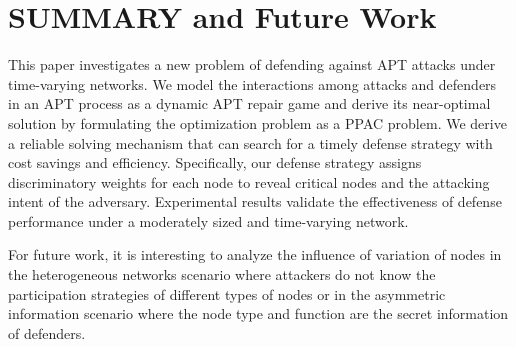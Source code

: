 \documentclass[lettersize,journal]{IEEEtran}
\begin{document}
\section{SUMMARY and Future Work}
This paper investigates a new problem of defending against APT attacks under time-varying networks. We model the interactions among attacks and defenders in an APT process as a dynamic APT repair game and derive its near-optimal solution by formulating the optimization problem as a PPAC problem. We derive a reliable solving mechanism that can search for a timely defense strategy with cost savings and efficiency. Specifically, our defense strategy assigns discriminatory weights for each node to reveal critical nodes and the attacking intent of the adversary. Experimental results validate the effectiveness of defense performance under a moderately sized and time-varying network. \par
For future work, it is interesting to analyze the influence of variation of nodes in the heterogeneous networks scenario where attackers do not know the participation strategies of different types of nodes or in the asymmetric information scenario where the node type and function are the secret information of defenders. 







 
%
%



{}

\end{document}
